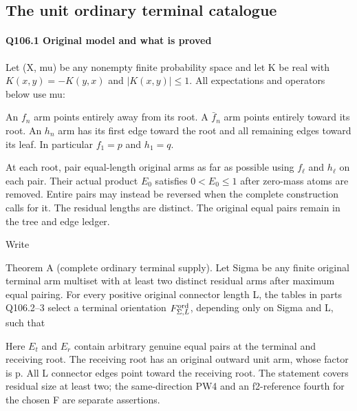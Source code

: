 \subsection{The unit ordinary terminal catalogue}\label{proof:Q5-C106}
\paragraph{Q106.1 Original model and what is proved}

Let (X, mu) be any nonempty finite probability space and let K be real with
\(K(x,\allowbreak y)=-K(y,\allowbreak x)\) and \(|K(x,\allowbreak y)|\le1\). All expectations and operators below use mu:


An \(f_n\) arm points entirely away from its root. A \(\bar f_n\) arm points entirely
toward its root. An \(h_n\) arm has its first edge toward the root and all
remaining edges toward its leaf. In particular \(f_1=p\) and \(h_1=q.\) 

At each root, pair equal-length original arms as far as possible using
\(f_\ell\) and \(h_\ell\) on each pair. Their actual product \(E_0\) satisfies
\(0<E_0\le 1\) after zero-mass atoms are removed. Entire pairs may instead be
reversed when the complete construction calls for it. The residual lengths
are distinct. The original equal pairs remain in the tree and edge ledger.

Write


Theorem A (complete ordinary terminal supply). Let Sigma be any
finite original terminal arm multiset with at least two distinct residual
arms after maximum equal pairing. For every positive original connector
length L, the tables in parts Q106.2--3 select a terminal orientation
\(F^{\rm ord}_{\Sigma,\allowbreak L}\), depending only on Sigma and L, such that


Here \(E_t\) and \(E_r\) contain arbitrary genuine equal pairs at the terminal and
receiving root. The receiving root has an original outward unit arm,
whose factor is p. All L connector edges point toward the receiving root.
The statement covers residual size at least two; the same-direction PW4 and an f2-reference fourth for the chosen F are separate assertions.

